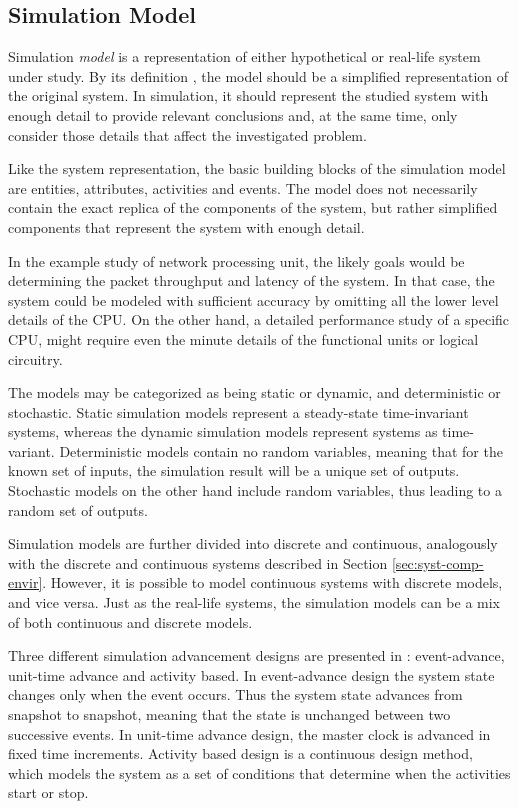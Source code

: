 \subsection{Simulation Model}
\label{sec:simulation-model}

Simulation \emph{model} is a representation of either hypothetical or real-life system under study. By its definition \cite{Encyclopedia of computer science}, the model should be a simplified representation of the original system. In simulation, it should represent the studied system with enough detail to provide relevant conclusions and, at the same time, only consider those details that affect the investigated problem. \cite{Banks:2010:DES}

Like the system representation, the basic building blocks of the simulation model are entities, attributes, activities and events. The model does not necessarily contain the exact replica of the components of the system, but rather simplified components that represent the system with enough detail. \cite{Banks:2010:DES}

In the example study of network processing unit, the likely goals would be determining the packet throughput and latency of the system. In that case, the system could be modeled with sufficient accuracy by omitting all the lower level details of the CPU. On the other hand, a detailed performance study of a specific CPU, might require even the minute details of the functional units or logical circuitry. \cite{TODO: find some simulation example for this}

The models may be categorized as being static or dynamic, and deterministic or stochastic. Static simulation models represent a steady-state time-invariant systems, whereas the dynamic simulation models represent systems as time-variant. Deterministic models contain no random variables, meaning that for the known set of inputs, the simulation result will be a unique set of outputs. Stochastic models on the other hand include random variables, thus leading to a random set of outputs. \cite{Banks:2010:DES}

Simulation models are further divided into discrete and continuous, analogously with the discrete and continuous systems described in Section \ref{sec:syst-comp-envir}. However, it is possible to model continuous systems with discrete models, and vice versa. Just as the real-life systems, the simulation models can be a mix of both continuous and discrete models.  \cite{Banks:2010:DES}

Three different simulation advancement designs are presented in \cite{PEROS}: event-advance, unit-time advance and activity based. In event-advance design the system state changes only when the event occurs. Thus the system state advances from snapshot to snapshot, meaning that the state is unchanged between two successive events. In unit-time advance design, the master clock is advanced in fixed time increments. Activity based design is a continuous design method, which models the system as a set of conditions that determine when the activities start or stop. \cite{PEROS}

